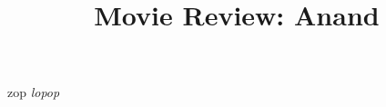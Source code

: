 \documentclass[12pt, a4paper]{article}
\title{Movie Review: Anand}
\author{}
\date{}
\begin{document}
\maketitle
zop \textit{lopop}
\end{document}
